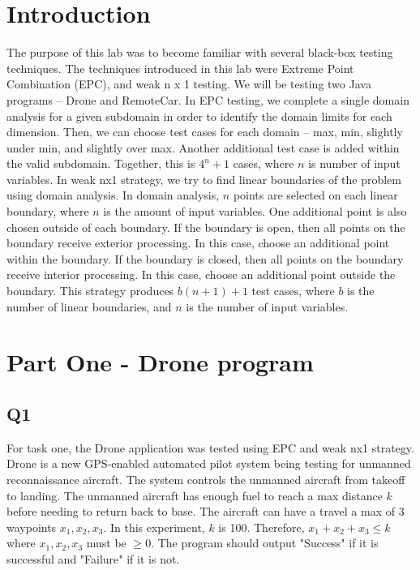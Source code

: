 \documentclass[12pt, letterpaper, titlepage]{article}
\begin{document}
 
\singlespacing

\section{Introduction}
The purpose of this lab was to become familiar with several black-box testing techniques. The techniques introduced in this lab were Extreme Point Combination (EPC), and weak n x 1 testing. We will be testing two Java programs -- Drone and RemoteCar. In EPC testing, we complete a single domain analysis for a given subdomain in order to identify the domain limits for each dimension. Then, we can choose test cases for each domain -- max, min, slightly under min, and slightly over max. Another additional test case is added within the valid subdomain. Together, this is $4^n + 1$ cases, where $n$ is number of input variables. In weak nx1 strategy, we try to find linear boundaries of the problem using domain analysis. In domain analysis, $n$ points are selected on each linear boundary, where $n$ is the amount of input variables. One additional point is also chosen outside of each boundary. If the boundary is open, then all points on the boundary receive exterior processing. In this case, choose an additional point within the boundary. If the boundary is closed, then all points on the boundary receive interior processing. In this case, choose an additional point outside the boundary. This strategy produces $b(n+1)+1$ test cases, where $b$ is the number of linear boundaries, and $n$ is the number of input variables.

\section{Part One - Drone program}
\subsection{Q1}
For task one, the Drone application was tested using EPC and weak nx1 strategy. Drone is a new GPS-enabled automated pilot system being testing for unmanned reconnaissance aircraft. The system controls the unmanned aircraft from takeoff to landing. The unmanned aircraft has enough fuel to reach a max distance $k$ before needing to return back to base. The aircraft can have a travel a max of 3 waypoints $x_1, x_2, x_3$. In this experiment, $k$ is 100. Therefore, $x_1 + x_2 + x_3 \leq k$ where $x_1, x_2, x_3$ must be $\geq 0$. The program should output "Success" if it is successful and "Failure" if it is not. 
\end{document}
